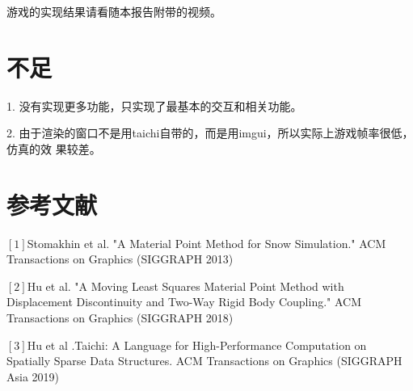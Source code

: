 \documentclass{article}
\begin{document}
	游戏的实现结果请看随本报告附带的视频。
	\section{不足}
	1. 没有实现更多功能，只实现了最基本的交互和相关功能。
	
	2. 由于渲染的窗口不是用taichi自带的，而是用imgui，所以实际上游戏帧率很低，仿真的效
	果较差。
\section{参考文献}
  $[1]$Stomakhin et al. "A Material Point Method for 
  Snow Simulation." ACM Transactions on Graphics (SIGGRAPH 2013)
  
  $[2]$Hu et al. "A Moving Least Squares Material Point 
  Method with Displacement Discontinuity and Two-Way Rigid Body Coupling." ACM 
  Transactions on Graphics (SIGGRAPH 2018)
  
  $[3]$Hu et al .Taichi: A Language for High-Performance Computation 
  on Spatially Sparse Data Structures. ACM Transactions on Graphics (SIGGRAPH 
  Asia 2019)
\end{document}
